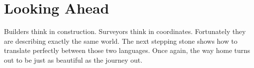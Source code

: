 \section*{Looking Ahead}

Builders think in construction. Surveyors think in coordinates. Fortunately they are describing exactly the same world. The next stepping stone shows how to translate perfectly between those two languages. Once again, the way home turns out to be just as beautiful as the journey out.
